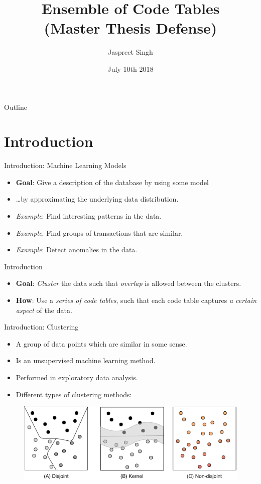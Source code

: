 \documentclass{beamer}
\title[Ensemble of Code Tables]{Ensemble of Code Tables \\ (Master Thesis Defense)}
\author{Jaspreet Singh}
\institute{Utrecht University}
\date{July 10th 2018}
\begin{document}
\begin{frame}
  \titlepage
\end{frame}

\begin{frame}{Outline}
 \tableofcontents
\end{frame}

\section{Introduction}

\begin{frame}{Introduction: Machine Learning Models}
\begin{itemize}
  \item \textbf{Goal}: Give a description of the database by using some model
  \item \ldots by approximating the underlying data distribution.
  \item \textit{Example}: Find interesting patterns in the data. 
  \item \textit{Example}: Find groups of transactions that are similar.
  \item \textit{Example}: Detect anomalies in the data.
\end{itemize}
\end{frame}

\begin{frame}{Introduction}
\begin{itemize}
  \item \textbf{Goal}: \textit{Cluster} the data such that \textit{overlap} is allowed between the clusters.
  \item \textbf{How}: Use a \textit{series of code tables}, such that each code table captures \textit{a certain aspect} of the data.
\end{itemize}
\end{frame}

\begin{frame}{Introduction: Clustering}
\begin{itemize}
  \item A group of data points which are similar in some sense.
  \item Is an unsupervised machine learning method.
  \item Performed in exploratory data analysis.
  \item Different types of clustering methods:
\end{itemize}

\begin{figure}
  \centering
  \includegraphics[width=\textwidth]{img/clusterTypes}
  \label{fig:clusterTypes}
\end{figure}

\end{frame}
\end{document}
